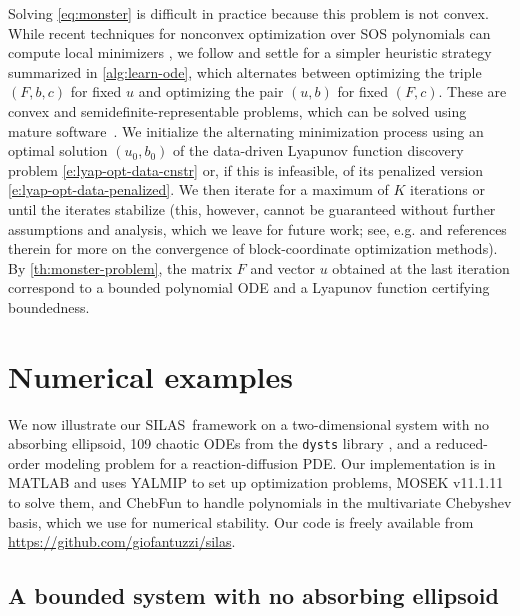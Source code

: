 \documentclass[11pt]{amsart}
\numberwithin{equation}{section}
\theoremstyle{plain}
\theoremstyle{definition}
\theoremstyle{remark}
\renewcommand{\vec}[1]{{#1}}
\newcommand{\mat}[1]{{#1}}
\newcommand{\methodname}{{SILAS}}
\begin{document}
%
Solving \cref{eq:monster} is difficult in practice because this problem is not convex. While recent techniques for nonconvex optimization over SOS polynomials can compute local minimizers \cite{Cunis2025,Olucak2025}, we follow \cite{heide2025} and settle for a simpler heuristic strategy summarized in \cref{alg:learn-ode}, which alternates between optimizing the triple $(\mat{F},b,c)$ for fixed $\vec{u}$ and optimizing the pair $(\vec{u},b)$ for fixed $(\mat{F},c)$. These are convex and semidefinite-representable problems, which can be solved using mature software~\cite{mosek,Lofberg2004}. We initialize the alternating minimization process using an optimal solution $(\vec{u}_0, b_0)$ of the data-driven Lyapunov function discovery problem \cref{e:lyap-opt-data-cnstr} or, if this is infeasible, of its penalized version \cref{e:lyap-opt-data-penalized}. We then iterate for a maximum of $K$ iterations or until the iterates stabilize (this, however, cannot be guaranteed without further assumptions and analysis, which we leave for future work; see, e.g. \cite{Bertsekas1999,Grippo1999,Beck2013} and references therein for more on the convergence of block-coordinate optimization methods). By \cref{th:monster-problem}, the matrix $\mat{F}$ and vector $\vec{u}$ obtained at the last iteration correspond to a bounded polynomial ODE and a Lyapunov function certifying boundedness.
\section{Numerical examples}\label{s:numerics}

We now illustrate our \methodname\ framework on a two-dimensional system with no absorbing ellipsoid, 109 chaotic ODEs from the \texttt{dysts} library \cite{gilpin2021chaos}, and a reduced-order modeling problem for a reaction-diffusion PDE. Our implementation is in MATLAB and uses YALMIP \cite{Lofberg2004} to set up optimization problems, MOSEK v11.1.11 \cite{mosek} to solve them, and ChebFun \cite{Driscoll2014} to handle polynomials in the multivariate Chebyshev basis, which we use for numerical stability. Our code is freely available from \url{https://github.com/giofantuzzi/silas}.

\subsection{A bounded system with no absorbing ellipsoid}\label{ss:ex3}
\end{document}
